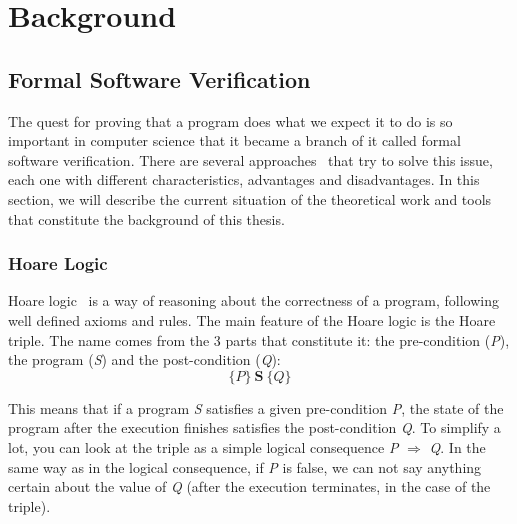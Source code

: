 
%

\chapter{Background}
\label{cha:background}

\glsresetall


\section{Formal Software Verification}
\label{sec:formal_software_verification}

The quest for proving that a program does what we expect it to do is so important in computer science that it became a branch of it called formal software verification. 
There are several approaches~\cite{DBLP:conf/fm/BrainP24} that try to solve this issue, each one with different characteristics, advantages and disadvantages. 
In this section, we will describe the current situation of the theoretical work and tools that constitute the background of this thesis.


\subsection{Hoare Logic} 
\label{sub:hoare_logic}

Hoare logic~\cite{hoare69} is a way of reasoning about the correctness of a program, following well defined axioms and rules.
The main feature of the Hoare logic is the Hoare triple. 
The name comes from the 3 parts that constitute it: the pre-condition (\emph{P}), the program (\emph{S}) and the post-condition (\emph{Q}):
\[ \{P\} \ \textbf{S} \ \{Q\} \]

This means that if a program \emph{S} satisfies a given pre-condition \emph{P}, the state of the program after the execution finishes satisfies the post-condition \emph{Q}.
To simplify a lot, you can look at the triple as a simple logical consequence \emph{P} $\Rightarrow$ \emph{Q}.
In the same way as in the logical consequence, if \emph{P} is false, we can not say anything certain about the value of \emph{Q} (after the execution terminates, in the case of the triple).

